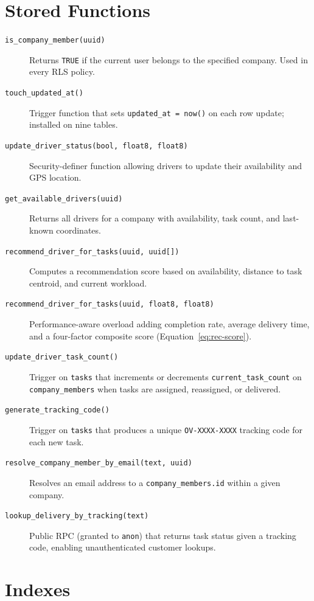 \section{Stored Functions}

\begin{description}
  \item[\texttt{is\_company\_member(uuid)}] Returns \texttt{TRUE} if the
    current user belongs to the specified company.  Used in every RLS policy.
  \item[\texttt{touch\_updated\_at()}] Trigger function that sets
    \texttt{updated\_at = now()} on each row update; installed on nine tables.
  \item[\texttt{update\_driver\_status\allowbreak(bool, float8, float8)}]
    Security-definer function allowing drivers to update their availability
    and GPS location.
  \item[\texttt{get\_available\_drivers(uuid)}] Returns all drivers for a
    company with availability, task count, and last-known coordinates.
  \item[\texttt{recommend\_driver\_for\_tasks\allowbreak(uuid, uuid[])}] Computes a
    recommendation score based on availability, distance to task centroid,
    and current workload.
  \item[\texttt{recommend\_driver\_for\_tasks\allowbreak(uuid, float8, float8)}]
    Performance-aware overload adding completion rate, average delivery
    time, and a four-factor composite score (Equation~\ref{eq:rec-score}).
  \item[\texttt{update\_driver\_task\_count()}] Trigger on \texttt{tasks}
    that increments or decrements \texttt{current\_task\_count} on
    \texttt{company\_members} when tasks are assigned, reassigned, or
    delivered.
  \item[\texttt{generate\_tracking\_code()}] Trigger on \texttt{tasks}
    that produces a unique \texttt{OV-XXXX-XXXX} tracking code for each
    new task.
  \item[\texttt{resolve\_company\_member\_\allowbreak by\_email(text, uuid)}]
    Resolves an email address to a \texttt{company\_members.id} within a
    given company.
  \item[\texttt{lookup\_delivery\_by\_\allowbreak tracking(text)}] Public RPC
    (granted to \texttt{anon}) that returns task status given a tracking
    code, enabling unauthenticated customer lookups.
\end{description}

\section{Indexes}

